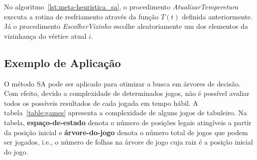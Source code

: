 No algoritmo~\ref{lst:meta-heuristica_sa}, o procedimento \textit{AtualizarTemperetura} executa a
rotina de resfriamento através da função $T(t)$ definida anteriormente. Já o procedimento
\textit{EscolherVizinho} escolhe aleatoriamente um dos elementos da vizinhança do vértice atual $i$.

\subsection{Exemplo de Aplicação}

O método SA pode ser aplicado para otimizar a busca em árvores de decisão.
Com efeito, devido a complexidade de determinados jogos, não é possível
avaliar todos os possíveis resultados de cada jogada em tempo hábil. A
tabela~\ref{table:games} apresenta a complexidade de alguns jogos de tabuleiro.
Na tabela, \textbf{espaço-de-estado} denota o número de posições legais
atingíveis a partir da posição inicial e \textbf{árvore-do-jogo} denota o
número total de jogos que podem ser jogados, i.e., o número de folhas na árvore
de jogo cuja raiz é a posição inicial do jogo.


